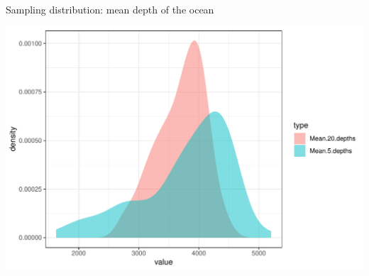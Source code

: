 \documentclass[10pt,handout]{beamer}\usepackage[]{graphicx}\usepackage[]{color}
\makeatletter
\def\maxwidth{ %
  \ifdim\Gin@nat@width>\linewidth
    \linewidth
  \else
    \Gin@nat@width
  \fi
}
\newenvironment{knitrout}{}{} %
\makeatother
\begin{document}
\begin{frame}[fragile]{Sampling distribution: mean depth of the ocean}
	
	
\begin{knitrout}\tiny
{}\color{fgcolor}

{\centering \includegraphics[width=\maxwidth]{figure/unnamed-chunk-5-1} 

}



\end{knitrout}
	
\end{frame}

\end{document}

